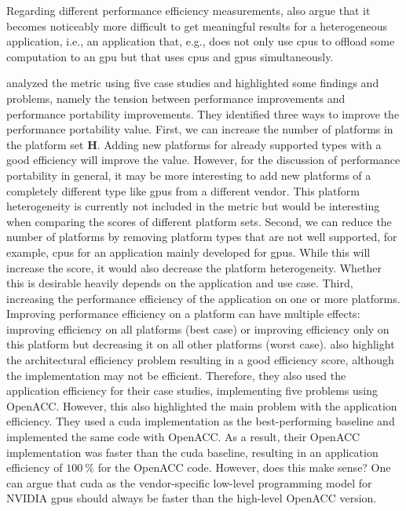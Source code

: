 Regarding different performance efficiency measurements, \citet{siklosi_heterogeneous_2018} also argue that it becomes noticeably more difficult to get meaningful results for a heterogeneous application, i.e., an application that, e.g.,  does not only use \glspl{cpu} to offload some computation to an \gls{gpu} but that uses \glspl{cpu} and \glspl{gpu} simultaneously. 

\citet{yokota_beginners_2018} analyzed the \pp metric using five case studies and highlighted some findings and problems, namely the tension between performance improvements and performance portability improvements. 
They identified three ways to improve the performance portability value. 
First, we can increase the number of platforms in the platform set $\mathbf{H}$. 
Adding new platforms for already supported types with a good efficiency will improve the \pp value. 
However, for the discussion of performance portability in general, it may be more interesting to add new platforms of a completely different type like \glspl{gpu} from a different vendor. 
This platform heterogeneity is currently not included in the \pp metric but would be interesting when comparing the \pp scores of different platform sets. 
Second, we can reduce the number of platforms by removing platform types that are not well supported, for example, \glspl{cpu} for an application mainly developed for \glspl{gpu}. 
While this will increase the \pp score, it would also decrease the platform heterogeneity. 
Whether this is desirable heavily depends on the application and use case. 
Third, increasing the performance efficiency of the application on one or more platforms. 
Improving performance efficiency on a platform can have multiple effects: improving efficiency on all platforms (best case) or improving efficiency only on this platform but decreasing it on all other platforms (worst case). 
\citeauthor{yokota_beginners_2018} also highlight the architectural efficiency problem resulting in a good efficiency score, although the implementation may not be efficient. 
Therefore, they also used the application efficiency for their case studies, implementing five problems using OpenACC. 
However, this also highlighted the main problem with the application efficiency. 
They used a \gls{cuda} implementation as the best-performing baseline and implemented the same code with OpenACC. 
As a result, their OpenACC implementation was faster than the \gls{cuda} baseline, resulting in an application efficiency of $\SI{100}{\percent}$ for the OpenACC code. 
However, does this make sense? 
One can argue that \gls{cuda} as the vendor-specific low-level programming model for NVIDIA \glspl{gpu} should always be faster than the high-level OpenACC version. 
